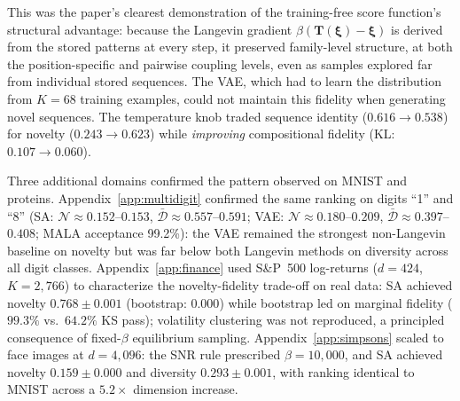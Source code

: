 This was the paper's clearest demonstration of the training-free score function's structural advantage: because the Langevin gradient $\beta(\mathbf{T}(\boldsymbol{\xi})-\boldsymbol{\xi})$ is derived from the stored patterns at every step, it preserved family-level structure, at both the position-specific and pairwise coupling levels, even as samples explored far from individual stored sequences. The VAE, which had to learn the distribution from $K{=}68$ training examples, could not maintain this fidelity when generating novel sequences. The temperature knob traded sequence identity ($0.616\to 0.538$) for novelty ($0.243\to 0.623$) while \emph{improving} compositional fidelity (KL: $0.107\to 0.060$).

Three additional domains confirmed the pattern observed on MNIST and proteins. Appendix~\ref{app:multidigit} confirmed the same ranking on digits ``1'' and ``8'' (SA: $\mathcal{N}{\approx}0.152$--$0.153$, $\bar{\mathcal{D}}{\approx}0.557$--$0.591$; VAE: $\mathcal{N}{\approx}0.180$--$0.209$, $\bar{\mathcal{D}}{\approx}0.397$--$0.408$; MALA acceptance 99.2\%): the VAE remained the strongest non-Langevin baseline on novelty but was far below both Langevin methods on diversity across all digit classes. Appendix~\ref{app:finance} used S\&P~500 log-returns ($d{=}424$, $K{=}2{,}766$) to characterize the novelty-fidelity trade-off on real data: SA achieved novelty $0.768\pm0.001$ (bootstrap: $0.000$) while bootstrap led on marginal fidelity ($99.3\%$ vs.\ $64.2\%$ KS pass); volatility clustering was not reproduced, a principled consequence of fixed-$\beta$ equilibrium sampling. Appendix~\ref{app:simpsons} scaled to face images at $d{=}4{,}096$: the SNR rule prescribed $\beta{=}10{,}000$, and SA achieved novelty $0.159\pm0.000$ and diversity $0.293\pm0.001$, with ranking identical to MNIST across a $5.2{\times}$ dimension increase.
